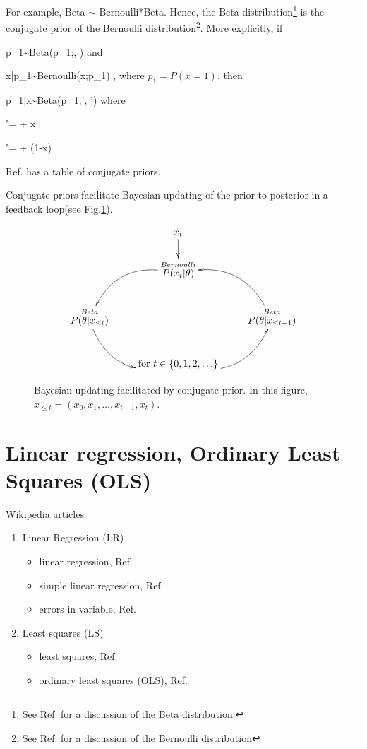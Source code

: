 For example, 
Beta $\sim$ Bernoulli*Beta.
Hence, the 
Beta distribution\footnote{See
Ref.\cite{wiki-beta-dist} for a discussion
of the Beta distribution.}
is the conjugate prior of the
Bernoulli distribution\footnote{See
Ref.\cite{wiki-bern-dist} for a discussion 
of the Bernoulli distribution}.
More explicitly,
if 

\beq
p_1\sim {\rm Beta}(p_1;\alp, \beta)
\eeq
and

\beq
x|p_1\sim {\rm Bernoulli}(x;p_1)
\;,
\eeq
where $p_1=P(x=1)$,
then

\beq
p_1|x\sim {\rm Beta}(p_1;\alp', \beta')
\eeq
where 

\beq
\alp'= \alp + x
\eeq

\beq
\beta'= \beta + (1-x)
\eeq


Ref.\cite{wiki-conj-prior}
has a table of
conjugate priors.

Conjugate priors facilitate  
Bayesian updating 
of the prior to 
posterior in a 
feedback loop(see Fig.\ref{fig-conj-prior}).

\begin{figure}[h!]
$$\xymatrix{
&x_t\ar[d]
\\
&\stackrel{Bernoulli}{P(x_t|\theta)}\ar@/_2pc/[ld]
\\
\stackrel{Beta}{P(\theta|x_{\leq t})}\ar@/_2pc/[rd]
&&\stackrel{Beta}{P(\theta|x_{\leq t-1})}\ar@/_2pc/[ul]
\\
&\text{for } t\in\{0, 1, 2,\ldots\}
\ar@/_2pc/[ur]
}$$
\caption{Bayesian updating facilitated
by conjugate prior. In this figure,
$x_{\leq t}=(x_0, x_1, \ldots, x_{t-1}, x_t)$.}
\label{fig-conj-prior}
\end{figure}



\section{Linear regression, Ordinary Least Squares (OLS)}
\label{sec-conv-lr}
Wikipedia articles
\begin{enumerate}
\item
Linear Regression (LR)
\begin{itemize}
\item
linear regression, Ref.\cite{wiki-lr}
\item
 simple linear regression, Ref.\cite{wiki-slr}
\item
errors in variable, Ref.\cite{wiki-errors-in-iv}

\end{itemize}
\item
Least squares (LS)
\begin{itemize}
\item
least squares, Ref.\cite{wiki-lsquares}
\item
ordinary least squares (OLS), Ref.\cite{wiki-ols}
\end{itemize}
\end{enumerate}


